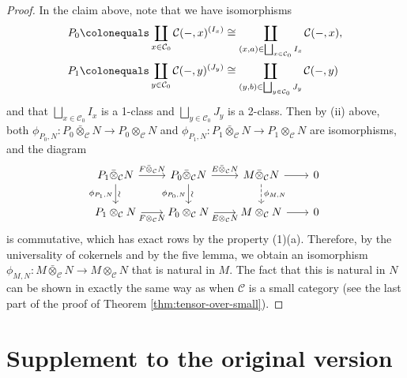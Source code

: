 \documentclass{surv-l}
\numberwithin{equation}{chapter}
\numberwithin{figure}{chapter}
\theoremstyle{plain}
\theoremstyle{definition}
\theoremstyle{remark}
\newcommand{\vsim}{\rotatebox{90}{$\sim$}}
\newcommand{\Ar}[3]{\ar[from={#1}, to={#2}, #3]}
\DeclareMathOperator{\blank}{-}
\begin{document}
\begin{proof}
In the claim above, note that we have isomorphisms
\[
\begin{aligned}
P_0\colonequals  \coprod_{x \in {\mathcal{C}}_0}{\mathcal{C}}(\blank, x)^{(I_x)} &\cong \coprod_{(x,a) \in \bigsqcup_{x\in {\mathcal{C}}_0}I_x}{\mathcal{C}}(\blank, x),\\
P_1\colonequals  \coprod_{y \in {\mathcal{C}}_0}{\mathcal{C}}(\blank, y)^{(J_y)} &\cong \coprod_{(y,b) \in \bigsqcup_{y\in {\mathcal{C}}_0}J_y}{\mathcal{C}}(\blank, y)
\end{aligned}
\]
and that $ \bigsqcup_{x\in {\mathcal{C}}_0}I_x$ is a 1-class
and $\bigsqcup_{y\in {\mathcal{C}}_0}J_y$ is a 2-class.
Then by (ii) above, both
$\phi_{P_0,N}\colon P_0\bar{\otimes}_{\mathcal{C}} N \to P_0 \otimes_{\mathcal{C}} N$ and
$\phi_{P_1,N} \colon P_1\bar{\otimes}_{\mathcal{C}} N \to P_1 \otimes_{\mathcal{C}} N$
are isomorphisms, and the diagram
\begin{equation}\label{eq:ph_M,N}
\begin{tikzcd}[column sep=2em]
P_1 \bar{\otimes}_{\mathcal{C}} N & P_0 \bar{\otimes}_{\mathcal{C}} N & M \bar{\otimes}_{\mathcal{C}} N & 0\\
P_1 \otimes_{\mathcal{C}} N & P_0 \otimes_{\mathcal{C}} N & M \otimes_{\mathcal{C}} N & 0
\Ar{1-1}{1-2}{"F\bar{\otimes}_{\mathcal{C}} N"}
\Ar{1-2}{1-3}{"E\bar{\otimes}_{\mathcal{C}} N"}
\Ar{1-3}{1-4}{}
\Ar{2-1}{2-2}{"F\otimes_{\mathcal{C}} N" '}
\Ar{2-2}{2-3}{"E\otimes_{\mathcal{C}} N" '}
\Ar{2-3}{2-4}{}
\Ar{1-1}{2-1}{"\vsim", "\phi_{P_1,N}" '}
\Ar{1-2}{2-2}{"\vsim", "\phi_{P_0,N}" '}
\Ar{1-3}{2-3}{"\phi_{M,N}", dashed}
\end{tikzcd}
\end{equation}
is commutative, which has exact rows by the property (1)(a).
Therefore, by the universality of cokernels and by the five lemma,
we obtain an isomorphism
$\phi_{M,N} \colon M\bar{\otimes}_{\mathcal{C}} N \to M \otimes_{\mathcal{C}} N$
that is natural in $M$.
The fact that this is natural in $N$ can be shown in exactly the same
way as when ${\mathcal{C}}$ is a small category
(see the last part of the proof of Theorem \ref{thm:tensor-over-small}).
\end{proof}



\chapter{Supplement to the original version}\label{app:b}
\end{document}
